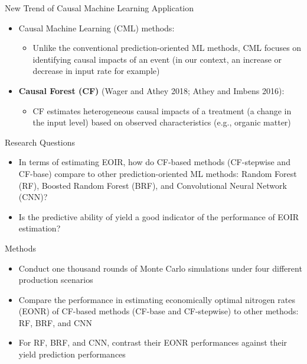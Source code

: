 \documentclass[
  12pt,
  ignorenonframetext,
  aspectratio=169,
]{beamer}
\providecommand{\tightlist}{%
  \setlength{\itemsep}{0pt}\setlength{\parskip}{0pt}}
\begin{document}
\begin{frame}{New Trend of Causal Machine Learning Application}
\protect\hypertarget{new-trend-of-causal-machine-learning-application}{}
\begin{itemize}
\tightlist
\item
  Causal Machine Learning (CML) methods:

  \begin{itemize}
  \tightlist
  \item
    Unlike the conventional prediction-oriented ML methods, CML focuses
    on identifying causal impacts of an event (in our context, an
    increase or decrease in input rate for example) \newline
  \end{itemize}
\item
  \textbf{Causal Forest (CF) } (Wager and Athey 2018; Athey and Imbens
  2016):

  \begin{itemize}
  \tightlist
  \item
    CF estimates heterogeneous causal impacts of a treatment (a change
    in the input level) based on observed characteristics (e.g., organic
    matter)
  \end{itemize}
\end{itemize}
\end{frame}

\begin{frame}{Research Questions}
\protect\hypertarget{research-questions}{}
\begin{block}{}
\protect\hypertarget{section}{}
\begin{itemize}
\tightlist
\item
  In terms of estimating EOIR, how do CF-based methods (CF-stepwise and
  CF-base) compare to other prediction-oriented ML methods: Random
  Forest (RF), Boosted Random Forest (BRF), and Convolutional Neural
  Network (CNN)? \newline
\item
  Is the predictive ability of yield a good indicator of the performance
  of EOIR estimation?
\end{itemize}
\end{block}
\end{frame}

\begin{frame}{Methods}
\protect\hypertarget{methods}{}
\begin{itemize}
\tightlist
\item
  Conduct one thousand rounds of Monte Carlo simulations under four
  different production scenarios
\item
  Compare the performance in estimating economically optimal nitrogen
  rates (EONR) of CF-based methods (CF-base and CF-stepwise) to other
  methods: RF, BRF, and CNN
\item
  For RF, BRF, and CNN, contrast their EONR performances against their
  yield prediction performances
\end{itemize}
\end{frame}
\end{document}
